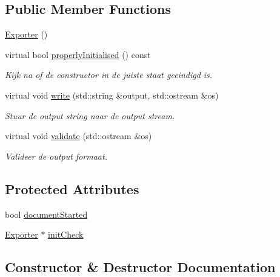 \subsection*{Public Member Functions}
\begin{DoxyCompactItemize}
\item 
\hyperlink{class_exporter_a2a977cb5ac8f637fcb570e73f650eca0}{Exporter} ()
\item 
virtual bool \hyperlink{class_exporter_aafd9df9210aeefd7bb7fd434fc317cf0}{properly\+Initialised} () const
\begin{DoxyCompactList}\small\item\em Kijk na of de constructor in de juiste staat geeindigd is. \end{DoxyCompactList}\item 
virtual void \hyperlink{class_exporter_ab3736803133eb727cf87a7306f91eb11}{write} (std\+::string \&output, std\+::ostream \&os)
\begin{DoxyCompactList}\small\item\em Stuur de output string naar de output stream. \end{DoxyCompactList}\item 
virtual void \hyperlink{class_exporter_a6fe3b356471d7f77502b511b5179a4a8}{validate} (std\+::ostream \&os)
\begin{DoxyCompactList}\small\item\em Valideer de output formaat. \end{DoxyCompactList}\end{DoxyCompactItemize}
\subsection*{Protected Attributes}
\begin{DoxyCompactItemize}
\item 
bool \hyperlink{class_exporter_a7d55f6023d5fe983512f6b02fb60733b}{document\+Started}
\item 
\hyperlink{class_exporter}{Exporter} $\ast$ \hyperlink{class_exporter_a74245e988d8e72a43704dda927acff05}{init\+Check}
\end{DoxyCompactItemize}


\subsection{Constructor \& Destructor Documentation}
\mbox{\label{class_exporter_a2a977cb5ac8f637fcb570e73f650eca0}} 
